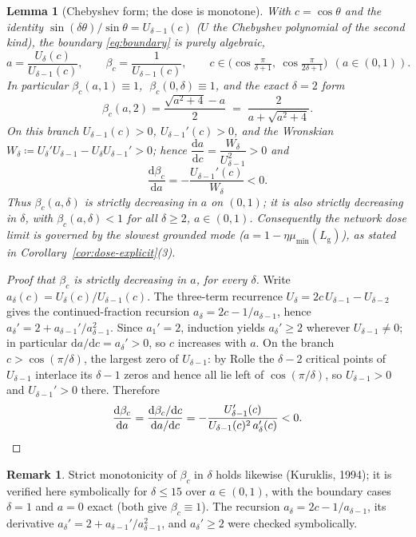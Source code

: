 \documentclass[11pt]{article}
\newtheorem{lemma}{Lemma}
\theoremstyle{definition}
\newtheorem{remark}{Remark}
\newcommand{\Lg}{L_{\mathrm g}}
\begin{document}
\begin{lemma}[Chebyshev form; the dose is monotone]\label{lem:cheb}
With $c=\cos\theta$ and the identity $\sin(\delta\theta)/\sin\theta=U_{\delta-1}(c)$
($U$ the Chebyshev polynomial of the second kind), the boundary \eqref{eq:boundary} is purely
algebraic,
\[
  a=\frac{U_\delta(c)}{U_{\delta-1}(c)},\qquad \beta_c=\frac{1}{U_{\delta-1}(c)},
  \qquad c\in\Big(\cos\tfrac{\pi}{\delta+1},\ \cos\tfrac{\pi}{2\delta+1}\Big)\ \ (a\in(0,1)).
\]
In particular $\beta_c(a,1)\equiv1$, $\;\beta_c(0,\delta)\equiv1$, and the exact $\delta=2$ form
\[
  \boxed{\;\beta_c(a,2)=\frac{\sqrt{a^2+4}-a}{2}\;=\;\frac{2}{a+\sqrt{a^2+4}}.\;}
\]
On this branch $U_{\delta-1}(c)>0$, $U_{\delta-1}'(c)>0$, and the Wronskian
$W_\delta\coloneqq U_\delta'U_{\delta-1}-U_\delta U_{\delta-1}'>0$; hence
$\dfrac{\mathrm da}{\mathrm dc}=\dfrac{W_\delta}{U_{\delta-1}^2}>0$ and
\[
  \frac{\mathrm d\beta_c}{\mathrm da}=-\frac{U_{\delta-1}'(c)}{W_\delta}<0 .
\]
Thus $\beta_c(a,\delta)$ is \emph{strictly decreasing in $a$} on $(0,1)$; it is also strictly
decreasing in $\delta$, with $\beta_c(a,\delta)<1$ for all $\delta\ge2$, $a\in(0,1)$.
Consequently the network dose limit is governed by the slowest grounded mode
($a=1-\eta\mu_{\min}(\Lg)$), as stated in Corollary~\ref{cor:dose-explicit}(3).
\end{lemma}

\begin{proof}[Proof that $\beta_c$ is strictly decreasing in $a$, for every $\delta$]
Write $a_\delta(c)=U_\delta(c)/U_{\delta-1}(c)$. The three-term recurrence
$U_\delta=2c\,U_{\delta-1}-U_{\delta-2}$ gives the continued-fraction recursion
$a_\delta=2c-1/a_{\delta-1}$, hence $a_\delta'=2+a_{\delta-1}'/a_{\delta-1}^2$. Since $a_1'=2$,
induction yields $a_\delta'\ge2$ wherever $U_{\delta-1}\neq0$; in particular
$\mathrm da/\mathrm dc=a_\delta'>0$, so $c$ increases with $a$. On the branch
$c>\cos(\pi/\delta)$, the largest zero of $U_{\delta-1}$: by Rolle the $\delta-2$ critical points
of $U_{\delta-1}$ interlace its $\delta-1$ zeros and hence all lie left of $\cos(\pi/\delta)$, so
$U_{\delta-1}>0$ and $U_{\delta-1}'>0$ there. Therefore
\[
  \frac{\mathrm d\beta_c}{\mathrm da}
  =\frac{\mathrm d\beta_c/\mathrm dc}{\mathrm da/\mathrm dc}
  =-\frac{U_{\delta-1}'(c)}{U_{\delta-1}(c)^2\,a_\delta'(c)}<0. \qedhere
\]
\end{proof}

\begin{remark}
Strict monotonicity of $\beta_c$ in $\delta$ holds likewise (Kuruklis, 1994); it is verified here
symbolically for $\delta\le15$ over $a\in(0,1)$, with the boundary cases $\delta{=}1$ and $a{=}0$
exact (both give $\beta_c\equiv1$). The recursion $a_\delta=2c-1/a_{\delta-1}$, its derivative
$a_\delta'=2+a_{\delta-1}'/a_{\delta-1}^2$, and $a_\delta'\ge2$ were checked symbolically.
\end{remark}
\end{document}
